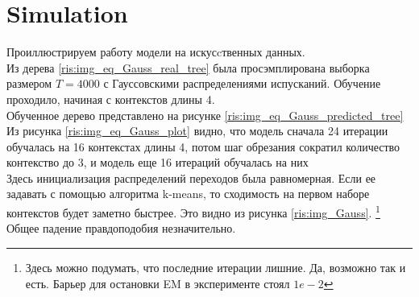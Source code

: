 \documentclass[10pt,a4paper]{article}
\begin{document}
\section{Simulation}
Проиллюстрируем работу модели на искусcтвенных данных.
\\
Из дерева \ref{ris:img_eq_Gauss_real_tree} была просэмплирована выборка размером $ T = 4000$ с Гауссовскими распределениями испусканий. Обучение проходило, начиная с контекстов длины 4. 
\\
Обученное дерево представлено на рисунке \ref{ris:img_eq_Gauss_predicted_tree}
\\
Из рисунка \ref{ris:img_eq_Gauss_plot} видно, что модель сначала 24 итерации обучалась на 16 контекстах длины 4, потом шаг обрезания сократил количество контекство до 3, и модель еще 16 итераций обучалась на них
\\
Здесь инициализация распределений переходов была равномерная. Если ее задавать с помощью алгоритма k-means, то сходимость на первом наборе контекстов будет заметно быстрее. Это видно из рисунка \ref{ris:img_Gauss}.
\footnote{Здесь можно подумать, что последние итерации лишние. Да, возможно так и есть. Барьер для остановки EM в эксперименте стоял $ 1e-2 $}
\\
Общее падение правдоподобия незначительно.
\end{document}
